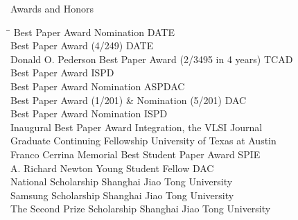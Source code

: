 
\begin{rSection}{Awards and Honors}
\begin{tabbing}
\hspace{3.8in}\= \hspace{2.6in}\= \kill
Best Paper Award Nomination \> DATE  \\
Best Paper Award (4/249) \> DATE  \\
Donald O. Pederson Best Paper Award (2/3495 in 4 years) \> TCAD  \\
Best Paper Award \> ISPD  \\
Best Paper Award Nomination \> ASPDAC  \\
Best Paper Award (1/201) \& Nomination (5/201) \> DAC  \\
Best Paper Award Nomination \> ISPD  \\
Inaugural Best Paper Award \> Integration, the VLSI Journal  \\
Graduate Continuing Fellowship \> University of Texas at Austin  \\
Franco Cerrina Memorial Best Student Paper Award \> SPIE  \\
A. Richard Newton Young Student Fellow \> DAC  \\
    National Scholarship \> Shanghai Jiao Tong University  \\
    Samsung Scholarship \> Shanghai Jiao Tong University  \\
    The Second Prize Scholarship \> Shanghai Jiao Tong University 
\end{tabbing}
\end{rSection}

